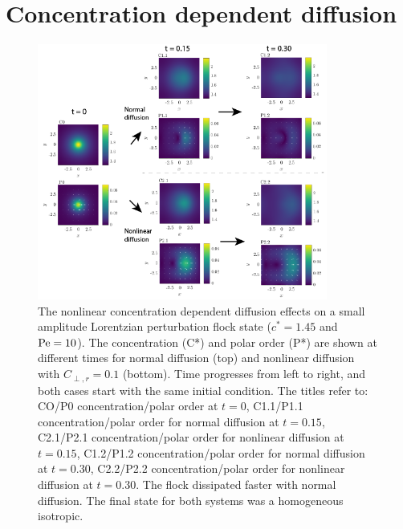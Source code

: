 \section{Concentration dependent diffusion}
\begin{figure}[!ht]
	\centering
  \includegraphics[width=0.85\textwidth]{figs/ch05_valid/nl_diff_break.png}
  \caption[Concentraion dependent diffusion (small flock perturbation)]
  {The nonlinear concentration dependent diffusion effects on a small
    amplitude Lorentzian perturbation flock state ($c^*=1.45$ and $\text{Pe} = 10$).
    The concentration (C*) and polar order (P*) are shown at different times for
    normal diffusion (top) and nonlinear diffusion with $C_{\perp,r} = 0.1$
    (bottom). Time progresses from left to right, and both cases start with the
    same initial condition. The titles refer to: CO/P0 concentration/polar order
    at $t=0$, C1.1/P1.1 concentration/polar order for normal diffusion at
    $t=0.15$, C2.1/P2.1 concentration/polar
    order for nonlinear diffusion at $t=0.15$, C1.2/P1.2 concentration/polar
    order for normal diffusion at $t=0.30$, C2.2/P2.2 concentration/polar
    order for nonlinear diffusion at $t=0.30$. The flock dissipated faster with
    normal diffusion. The final state for both systems was a homogeneous
    isotropic.}\label{fig:nl_diff_break}
\end{figure}

